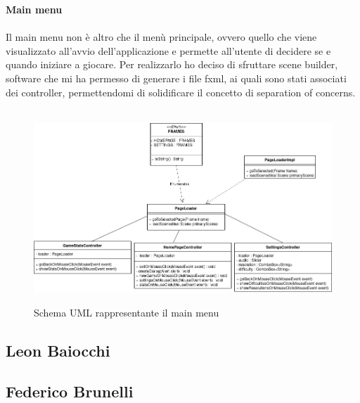 \newpage

\textbf{Main menu} \\ \\

Il main menu non è altro che il menù principale, ovvero quello che viene visualizzato all'avvio dell'applicazione e permette all'utente di decidere se e quando iniziare a giocare.
Per realizzarlo ho deciso di sfruttare scene builder, software che mi ha permesso di generare i file fxml, ai quali sono stati associati dei controller, permettendomi di solidificare il concetto di separation of concerns. \\ \\

\begin{figure}[H]
	\centering{}
	\includegraphics[width=\textwidth]{img/main_menu}
	\label{img:main_menu.png}
	\caption{Schema UML rappresentante il main menu\\}
\end{figure}



\newpage

\subsection*{Leon Baiocchi}


\newpage

\subsection*{Federico Brunelli}


